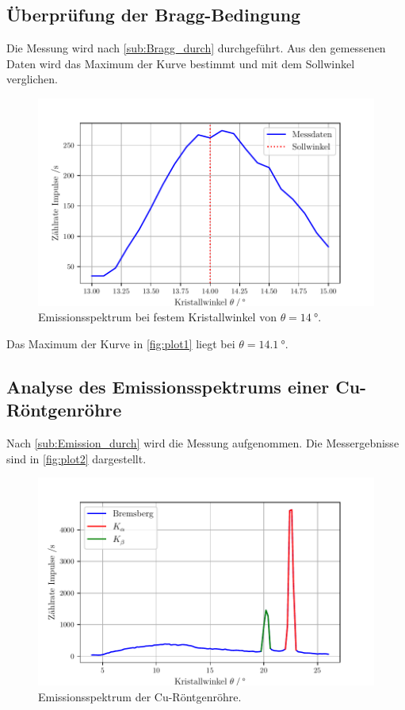 \subsection{Überprüfung der Bragg-Bedingung} %
\label{sub:Bragg_aus}
Die Messung wird nach \autoref{sub:Bragg_durch} durchgeführt.
Aus den gemessenen Daten wird das Maximum der Kurve bestimmt und mit dem Sollwinkel verglichen.
\begin{figure}[H]
  \centering
  \includegraphics[width=\textwidth]{build/plot1.pdf}
  \caption{Emissionsspektrum bei festem Kristallwinkel von $\theta = \qty{14}{\degree}$.}
  \label{fig:plot1}
\end{figure}

Das Maximum der Kurve in \autoref{fig:plot1} liegt bei $\theta=\qty{14.1}{\degree}$.


\subsection{Analyse des Emissionsspektrums einer Cu-Röntgenröhre} %
\label{sub:Emission_aus}

Nach \autoref{sub:Emission_durch} wird die Messung aufgenommen. Die Messergebnisse sind in \autoref{fig:plot2} dargestellt.
\begin{figure}[H]
  \centering
  \includegraphics[width=\textwidth]{build/plot2.pdf}
  \caption{Emissionsspektrum der Cu-Röntgenröhre.}
  \label{fig:plot2}
\end{figure}

